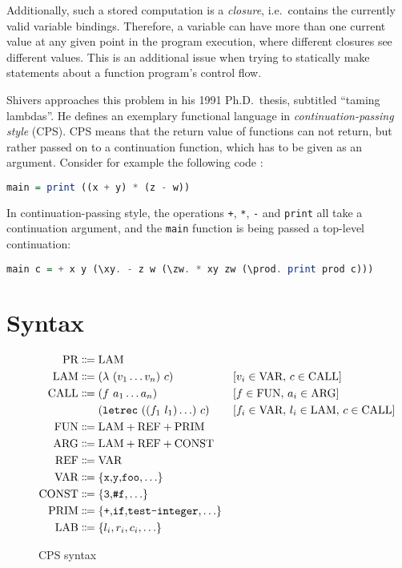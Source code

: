 \documentclass[a4paper,halfparskip,DIV=10,11pt]{scrbook}
\begin{document}
Additionally, such a stored computation is a \textit{closure}, i.e.\ contains the currently valid variable bindings. Therefore, a variable can have more than one current value at any given point in the program execution, where different closures see different values. This is an additional issue when trying to statically make statements about a function program’s control flow.

Shivers approaches this problem in his 1991 Ph.D.\ thesis, subtitled “taming lambdas”. He defines an exemplary functional language in \textit{continuation-passing style} (CPS). CPS means that the return value of functions can not return, but rather passed on to a continuation function, which has to be given as an argument. Consider for example the following code :
\begin{lstlisting}[language=Haskell]
main = print ((x + y) * (z - w))
\end{lstlisting}
In continuation-passing style, the operations \lstinline!+!, \lstinline!*!, \lstinline!-! and \lstinline!print! all take a continuation argument, and the \lstinline!main! function is being passed a top-level continuation: 
\begin{lstlisting}[language=Haskell]
main c = + x y (\xy. - z w (\zw. * xy zw (\prod. print prod c)))
\end{lstlisting}

\section{Syntax}

\begin{figure}
\begin{framed}
\begin{align*}
\text{PR} &\Coloneqq \text{LAM} \\
\text{LAM} &\Coloneqq (\lambda\ (v_1\ldots v_n)\ c) && [v_i\in \text{VAR},\, c\in\text{CALL}] \\
\text{CALL} &\Coloneqq (f\ a_1 \ldots a_n) && [f\in \text{FUN},\, a_i\in\text{ARG}] \\
&\phantom{\strut\Coloneqq\strut} (\text{\texttt{letrec}}\ ((f_1\ l_1)\ldots)\ c) && [f_i\in \text{VAR},\,l_i\in\text{LAM},\,c\in\text{CALL}] \\
\text{FUN} &\Coloneqq \text{LAM} + \text{REF} + \text{PRIM} \\
\text{ARG} &\Coloneqq \text{LAM} + \text{REF} + \text{CONST} \\
\text{REF} &\Coloneqq \text{VAR} \\
\text{VAR} &\Coloneqq \{\text{\texttt{x},\texttt{y},\texttt{foo},}\ldots\} \\
\text{CONST} &\Coloneqq \{\text{\texttt{3},\texttt{\#f},}\ldots\} \\
\text{PRIM} &\Coloneqq \{\text{\texttt{+},\texttt{if},\texttt{test-integer},}\ldots\} \\
\text{LAB} &\Coloneqq \{l_i,r_i,c_i,\ldots\} %
\end{align*}
\end{framed}
\caption{CPS syntax}
\label{fig:syntax}
\end{figure}
\end{document}
